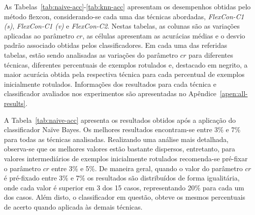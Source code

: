         As Tabelas~\ref{tab:naive-acc}-\ref{tab:knn-acc} apresentam os desempenhos obtidas pelo método \ac{flexcon}, considerando\hyp{se} cada uma das técnicas abordadas, \textit{FlexCon\hyp{C1} (s)}, \textit{FlexCon\hyp{C1} (v)} e \textit{FlexCon\hyp{C2}}. Nestas tabelas, as colunas são as variações aplicadas ao parâmetro $cr$, as células apresentam as acurácias médias e o desvio padrão associado obtidas pelos classificadores. Em cada uma das referidas tabelas, estão sendo analisadas as variações do parâmetro $cr$ para diferentes técnicas, diferentes percentuais de exemplos rotulados e, destacado em negrito, a maior acurácia obtida pela respectiva técnica para cada percentual de exemplos inicialmente rotulados. Informações dos resultados para cada técnica e classificador avaliados nos experimentos são apresentadas no Apêndice~\ref{apen:all-results}.
        
        A Tabela~\ref{tab:naive-acc} apresenta os resultados obtidos após a aplicação do classificador Na\"ive Bayes. Os melhores resultados encontram\hyp{se} entre 3\% e 7\% para todas as técnicas analisadas. Realizando uma análise mais detalhada, observa\hyp{se} que os melhores valores estão bastante dispersos, entretanto, para valores intermediários de exemplos inicialmente rotulados recomenda\hyp{se} pré\hyp{fixar} o parâmetro $cr$ entre 3\% e 5\%. De maneira geral, quando o valor do parâmetro $cr$ é pré\hyp{fixado} entre 3\% e 7\% os resultados são distribuídos de forma igualitária, onde cada valor é superior em 3 dos 15 casos, representando 20\% para cada um dos casos. Além disto, o classificador em questão, obteve os mesmos percentuais de acerto quando aplicada às demais técnicas.
    
